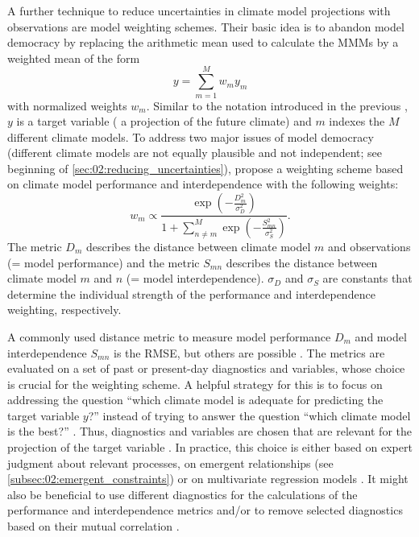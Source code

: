 A further technique to reduce uncertainties in climate model projections with
observations are model weighting schemes. Their basic idea is to abandon model
democracy by replacing the arithmetic mean used to calculate the \acp{MMM} by a
weighted mean of the form
\begin{equation}
  y = \sum_{m=1}^{M} w_m y_m
  \label{eq:02:weighted_mean}
\end{equation}
with normalized weights $w_m$. Similar to the notation introduced in the
previous , $y$ is a target variable
(\eg{} a projection of the future climate) and $m$ indexes the $M$ different
climate models. To address two major issues of model democracy (different
climate models are not equally plausible and not independent; see beginning of
\cref{sec:02:reducing_uncertainties}), \textcite{Knutti2017a} propose a
weighting scheme based on climate model performance and interdependence with
the following weights:
\begin{equation}
  w_m \propto \frac{\exp \left( -\frac{D_m^2}{\sigma_D^2} \right)}{1 + \sum_{n
    \neq m}^{M} \exp \left( -\frac{S_{mn}^2}{\sigma_S^2} \right)}.
  \label{eq:02:knutti_weights}
\end{equation}
The metric $D_m$ describes the distance between climate model $m$ and
observations (= model performance) and the metric $S_{mn}$ describes the
distance between climate model $m$ and $n$ (= model interdependence).
$\sigma_D$ and $\sigma_S$ are constants that determine the individual strength
of the performance and interdependence weighting, respectively.

A commonly used distance metric to measure model performance $D_m$ and model
interdependence $S_{mn}$ is the \ac{RMSE}, but others are possible
\autocite{Knutti2017a}. The metrics are evaluated on a set of past or
present-day diagnostics and variables, whose choice is crucial for the
weighting scheme. A helpful strategy for this is to focus on addressing the
question \enquote{which climate model is adequate for predicting the target
  variable $y$?} instead of trying to answer the question \enquote{which
  climate model is the best?} \autocite{Parker2009}. Thus, diagnostics and
variables are chosen that are relevant for the projection of the target
variable \autocite{Knutti2017a}. In practice, this choice is either based on
expert judgment about relevant processes, on emergent relationships (see
\cref{subsec:02:emergent_constraints}) or on multivariate regression models
. It
might also be beneficial to use different diagnostics for the calculations of
the performance and interdependence metrics \autocite{Merrifield2020} and/or to
remove selected diagnostics based on their mutual correlation
\autocite{Lorenz2018}.

